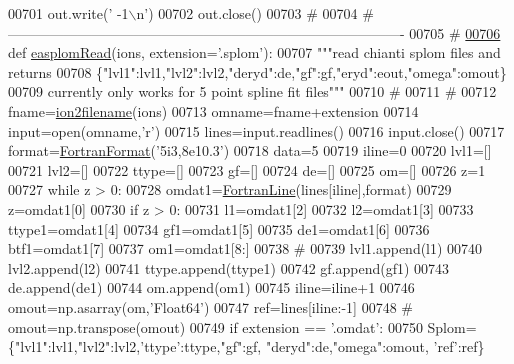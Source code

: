 \begin{DoxyCode}
{{{{{{{{{{{00701     out.write(\textcolor{stringliteral}{' -1\(\backslash\)n'})
00702     out.close()
00703     \textcolor{comment}{#}
00704     \textcolor{comment}{# -------------------------------------------------------------------------------------}
00705     \textcolor{comment}{#}
\hypertarget{__chianti__tools_8py_source_l00706}{}\hyperlink{namespacepyneb_1_1utils_1_1__chianti__tools_aa36b22e4e67bccdea3436dcc05e7ba5b}{00706} \textcolor{keyword}{def }\hyperlink{namespacepyneb_1_1utils_1_1__chianti__tools_aa36b22e4e67bccdea3436dcc05e7ba5b}{easplomRead}(ions, extension='.splom'):
00707     \textcolor{stringliteral}{"""read chianti splom files and returns}
00708 \textcolor{stringliteral}{    \{"lvl1":lvl1,"lvl2":lvl2,"deryd":de,"gf":gf,"eryd":eout,"omega":omout\}}
00709 \textcolor{stringliteral}{    currently only works for 5 point spline fit files"""}
00710     \textcolor{comment}{#}
00711     \textcolor{comment}{#}
00712     fname=\hyperlink{namespacepyneb_1_1utils_1_1__chianti__tools_ad4bc7b577fd4c3819ceb00b0a444351b}{ion2filename}(ions)
00713     omname=fname+extension
00714     input=open(omname,\textcolor{stringliteral}{'}\textcolor{stringliteral}{r')}
00715 \textcolor{stringliteral}{    lines=input.readlines()}
00716 \textcolor{stringliteral}{    input.close()}
00717 \textcolor{stringliteral}{    format=\hyperlink{classpyneb_1_1utils_1_1_fortran_format_1_1_fortran_format}{FortranFormat}(}\textcolor{stringliteral}{'5i3,8e10.3'})
00718     data=5
00719     iline=0
00720     lvl1=[]
00721     lvl2=[]
00722     ttype=[]
00723     gf=[]
00724     de=[]
00725     om=[]
00726     z=1
00727     \textcolor{keywordflow}{while} z > 0:
00728         omdat1=\hyperlink{classpyneb_1_1utils_1_1_fortran_format_1_1_fortran_line}{FortranLine}(lines[iline],format)
00729         z=omdat1[0]
00730         \textcolor{keywordflow}{if} z > 0:
00731             l1=omdat1[2]
00732             l2=omdat1[3]
00733             ttype1=omdat1[4]
00734             gf1=omdat1[5]
00735             de1=omdat1[6]
00736             btf1=omdat1[7]
00737             om1=omdat1[8:]
00738             \textcolor{comment}{#}
00739             lvl1.append(l1)
00740             lvl2.append(l2)
00741             ttype.append(ttype1)
00742             gf.append(gf1)
00743             de.append(de1)
00744             om.append(om1)
00745         iline=iline+1
00746     omout=np.asarray(om,\textcolor{stringliteral}{'Float64'})
00747     ref=lines[iline:-1]
00748 \textcolor{comment}{#        omout=np.transpose(omout)}
00749     \textcolor{keywordflow}{if} extension == \textcolor{stringliteral}{'.omdat'}:
00750         Splom=\{\textcolor{stringliteral}{"lvl1"}:lvl1,\textcolor{stringliteral}{"lvl2"}:lvl2,\textcolor{stringliteral}{'ttype'}:ttype,\textcolor{stringliteral}{"gf"}:gf, \textcolor{stringliteral}{"deryd"}:de,\textcolor{stringliteral}{"omega"}:omout, \textcolor{stringliteral}{'ref'}:ref\}
}}}}}}}}}}}
\end{DoxyCode}
